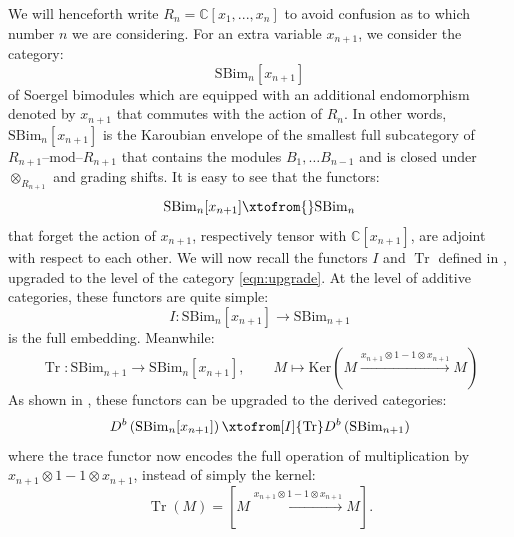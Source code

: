 \documentclass[12pt]{amsart}
\numberwithin{equation}{section}
\theoremstyle{definition}
\theoremstyle{remark}
\DeclareMathOperator{\Tr}{Tr}
\newcommand{\CC}{\mathbb{C}}
\renewcommand{\1}{\mathbf{1}}
\newcommand{\SBim}{\mathrm{SBim}}
\begin{document}
We will henceforth write $R_n = \CC[x_1,...,x_n]$ to avoid confusion as to which number $n$ we are considering. For an extra variable $x_{n+1}$, we consider the category:
\begin{equation}
\label{eqn:upgrade}
\SBim_n[x_{n+1}]
\end{equation}
of Soergel bimodules which are equipped with an additional endomorphism denoted by $x_{n+1}$ that commutes with the action of $R_n$.
In other words, $\SBim_n[x_{n+1}]$ is the Karoubian envelope of the smallest full subcategory of $R_{n+1}\text{--mod--}R_{n+1}$ that contains the modules $B_1,\ldots B_{n-1}$ and is closed under $\otimes_{R_{n+1}}$ and grading shifts. 
 It is easy to see that the functors:
$$
\SBim_n[x_{n+1}] \xtofrom{} \SBim_n
$$
that forget the action of $x_{n+1}$, respectively tensor with $\CC[x_{n+1}]$, are adjoint with respect to each other. We will now recall the functors $I$ and $\Tr$ defined in \cite{Hog}, upgraded to the level of the category \eqref{eqn:upgrade}. At the level of additive categories, these functors are quite simple:
$$
I: \SBim_n[x_{n+1}] \longrightarrow \SBim_{n+1}
$$
is the full embedding. Meanwhile:
$$
\Tr: \SBim_{n+1} \longrightarrow \SBim_n[x_{n+1}], \qquad M \mapsto \text{Ker} \left(M \xrightarrow{x_{n+1} \otimes 1 - 1 \otimes x_{n+1}}  M \right)
$$
As shown in \cite{Hog}, these functors can be upgraded to the derived categories:
$$
D^b\left(\SBim_n[x_{n+1}]\right) \xtofrom[I]{\Tr}  D^b\left(\SBim_{n+1}\right)
$$
where the trace functor now encodes the full operation of multiplication by $x_{n+1} \otimes 1 - 1 \otimes x_{n+1}$, instead of simply the kernel:
$$
\Tr(M) = \left[ M \xrightarrow{x_{n+1} \otimes 1 - 1 \otimes x_{n+1}}  M \right].
$$
\end{document}
